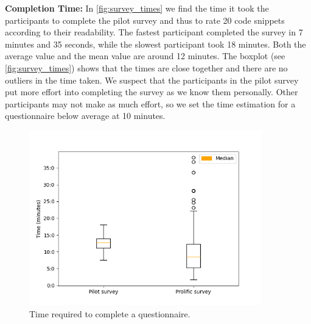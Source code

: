 \documentclass[%
class=scrreprt,
chapterprefix=false,%
open=right,%
twoside=false,%
paper=a4,%
logofile={Logo\_zentral\_farbig\_EN.png},%
thesistype=master,%
UKenglish,%
]{se2thesis}
\theoremstyle{definition}
\begin{document}
	\textbf{Completion Time:} 
	In \autoref{fig:survey_times} we find the time it took the participants to complete the pilot survey and thus to rate 20 code snippets according to their readability. 
	The fastest participant completed the survey in 7 minutes and 35 seconds, while the slowest participant took 18 minutes. 
	Both the average value and the mean value are around 12 minutes. The boxplot (see \autoref{fig:survey_times}) shows that the times are close together and there are no outliers in the time taken.
	We suspect that the participants in the pilot survey put more effort into completing the survey as we know them personally. 
	Other participants may not make as much effort, so we set the time estimation for a questionnaire below average at 10 minutes.
		

	\begin{figure}[tb]
		\centering
		\includegraphics[width=0.9\textwidth]{img/survey_times.png}
		\caption{Time required to complete a questionnaire.}
		\label{fig:survey_times}
	\end{figure}
		
\end{document}

